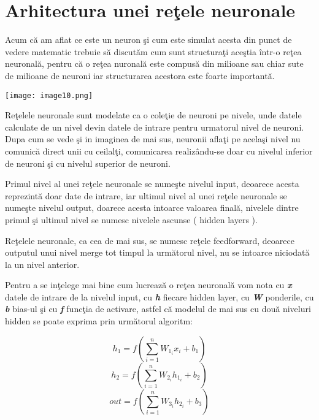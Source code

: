 \section{Arhitectura unei re\c{t}ele neuronale}

Acum c\u{a} am aflat ce este un neuron \c{s}i cum este simulat acesta din punct de vedere matematic trebuie s\u{a} discut\u{a}m cum sunt structura\c{t}i ace\c{s}tia \^{i}ntr-o re\c{t}ea neuronal\u{a}, pentru c\u{a} o re\c{t}ea nuronal\u{a} este compus\u{a} din milioane sau chiar sute de milioane de neuroni iar structurarea acestora este foarte important\u{a}.

\begin{center}
\texttt{[image: image10.png]}
\end{center}

Re\c{t}elele neuronale sunt modelate ca o cole\c{t}ie de neuroni pe nivele, unde datele calculate de un nivel devin datele de intrare pentru urmatorul nivel de neuroni. Dupa cum se vede \c{s}i in imaginea de mai sus, neuronii afla\c{t}i pe acela\c{s}i nivel nu comunic\u{a} direct unii cu ceilal\c{t}i, comunicarea realiz\^{a}ndu-se doar cu nivelul inferior de neuroni \c{s}i cu nivelul superior de neuroni.
\par
Primul nivel al unei re\c{t}ele neuronale se nume\c{s}te nivelul input, deoarece acesta reprezint\u{a} doar date de intrare, iar ultimul nivel al unei re\c{t}ele neuronale se nume\c{s}te nivelul output, doarece acesta intoarce valoarea final\u{a}, nivelele dintre primul \c{s}i ultimul nivel se numesc nivelele ascunse ( hidden layers ).
\par
Re\c{t}elele neuronale, ca cea de mai sus, se numesc re\c{t}ele feedforward, deoarece outputul unui nivel merge tot timpul la urm\u{a}torul nivel, nu se intoarce niciodat\u{a} la un nivel anterior.
\par 
Pentru a se in\c{t}elege mai bine cum lucreaz\u{a} o re\c{t}ea neuronal\u{a} vom nota cu \textbf{\textit{x}} datele de intrare de la nivelul input, cu \textbf{\textit{h}} fiecare hidden layer, cu \textbf{\textit{W}} ponderile, cu \textbf{\textit{b}} bias-ul \c{s}i cu \textbf{\textit{f}} func\c{t}ia de activare, astfel c\u{a} modelul de mai sus cu dou\u{a} niveluri hidden se poate exprima prin urm\u{a}torul algoritm:

$$h_1 = f( \sum_{i=1}^{n} W_1_i x_i + b_1 ) $$
$$h_2 = f( \sum_{i=1}^{n} W_2_i h_1_i + b_2 ) $$
$$out = f( \sum_{i=1}^{n} W_3_i h_2_i + b_3 ) $$

\par

